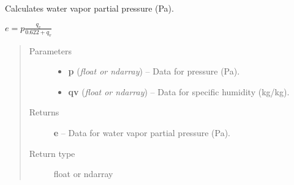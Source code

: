 \documentclass[letterpaper,10pt,english]{sphinxmanual}
\begin{document}

\begin{fulllineitems}
\label{atmos:atmos.equations.e_from_p_qv}
Calculates water vapor partial pressure (Pa).

\(e = p \frac{q_v}{0.622+q_v}\)
\begin{quote}\begin{description}
\item[{Parameters}] \leavevmode\begin{itemize}
\item {} 
\textbf{p} (\emph{float or ndarray}) -- Data for pressure (Pa).

\item {} 
\textbf{qv} (\emph{float or ndarray}) -- Data for specific humidity (kg/kg).

\end{itemize}

\item[{Returns}] \leavevmode
\textbf{e} --
Data for water vapor partial pressure (Pa).

\item[{Return type}] \leavevmode
float or ndarray

\end{description}\end{quote}

\end{fulllineitems}

\end{document}
